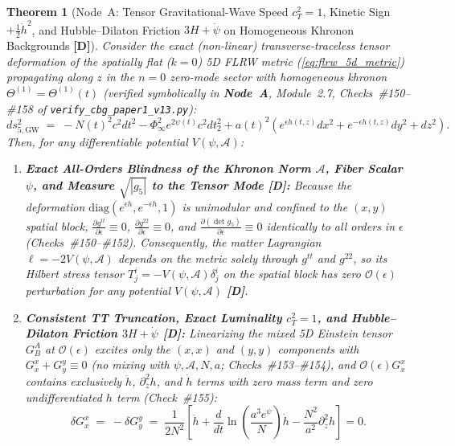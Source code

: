 \documentclass[11pt,a4paper]{article}
\newcommand{\catD}{\textbf{\textcolor{blue!75!black}{[D]}}}
\newtheorem{theorem}{Theorem}[section]
\theoremstyle{definition}
\theoremstyle{remark}
\begin{document}
\begin{theorem}[Node~A: Tensor Gravitational-Wave Speed $c_T^2 = 1$, Kinetic Sign $+\frac{1}{2}\dot{h}^2$, and Hubble--Dilaton Friction $3H + \dot{\psi}$ on Homogeneous Khronon Backgrounds \catD]
\label{thm:node_a_tensor_gw}
Consider the exact (non-linear) transverse-traceless tensor deformation of the spatially flat ($k = 0$) 5D FLRW metric (\ref{eq:flrw_5d_metric}) propagating along $z$ in the $n = 0$ zero-mode sector with homogeneous khronon $\Theta^{(1)} = \Theta^{(1)}(t)$ (verified symbolically in \textbf{Node~A}, Module~2.7, Checks~\#150--\#158 of \texttt{verify\_cbg\_paper1\_v13.py}):
\begin{equation}
  ds_{5,\text{GW}}^2 \;=\; -N(t)^2 c^2 dt^2 - \Phi_\infty^2 e^{2\psi(t)} c^2 dt_2^2 + a(t)^2\left(e^{\epsilon h(t,z)} dx^2 + e^{-\epsilon h(t,z)} dy^2 + dz^2\right).
  \label{eq:node_a_gw_metric}
\end{equation}
Then, for any differentiable potential $V(\psi, \mathcal{A})$:
\begin{enumerate}
  \item[\textnormal{(i)}] \textbf{Exact All-Orders Blindness of the Khronon Norm $\mathcal{A}$, Fiber Scalar $\psi$, and Measure $\sqrt{|g_5|}$ to the Tensor Mode \catD:} Because the deformation $\text{diag}(e^{\epsilon h}, e^{-\epsilon h}, 1)$ is unimodular and confined to the $(x,y)$ spatial block, $\frac{\partial g^{tt}}{\partial\epsilon} \equiv 0$, $\frac{\partial g^{22}}{\partial\epsilon} \equiv 0$, and $\frac{\partial(\det g_5)}{\partial\epsilon} \equiv 0$ identically to all orders in $\epsilon$ (Checks~\#150--\#152). Consequently, the matter Lagrangian $\ell = -2V(\psi, \mathcal{A})$ depends on the metric solely through $g^{tt}$ and $g^{22}$, so its Hilbert stress tensor $T^i_j = -V(\psi, \mathcal{A})\delta^i_j$ on the spatial block has zero $\mathcal{O}(\epsilon)$ perturbation for \emph{any} potential $V(\psi, \mathcal{A})$ \catD.
  \item[\textnormal{(ii)}] \textbf{Consistent TT Truncation, Exact Luminality $c_T^2 = 1$, and Hubble--Dilaton Friction $3H + \dot{\psi}$ \catD:} Linearizing the mixed 5D Einstein tensor $G^A_B$ at $\mathcal{O}(\epsilon)$ excites only the $(x,x)$ and $(y,y)$ components with $G^x_x + G^y_y \equiv 0$ (no mixing with $\psi, \mathcal{A}, N, a$; Checks~\#153--\#154), and $\mathcal{O}(\epsilon)G^x_x$ contains exclusively $\ddot{h}$, $\partial_z^2 h$, and $\dot{h}$ terms with zero mass term and zero undifferentiated $h$ term (Check~\#155):
  \begin{equation}
    \delta G^x_x \;=\; -\delta G^y_y \;=\; \frac{1}{2 N^2}\left[\ddot{h} + \frac{d}{dt}\ln\!\left(\frac{a^3 e^\psi}{N}\right)\dot{h} - \frac{N^2}{a^2}\partial_z^2 h\right] = 0.

\end{equation}
\end{enumerate}
\end{theorem}
\end{document}

